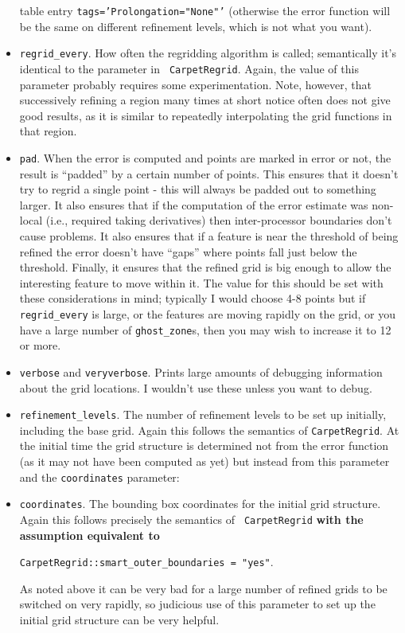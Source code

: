 \begin{itemize}
  table entry {\tt tags='Prolongation="None"'} (otherwise the error
  function will be the same on different refinement levels, which is
  not what you want).
\item {\tt regrid\_every}. How often the regridding algorithm is
  called; semantically it's identical to the parameter in {\tt
    CarpetRegrid}. Again, the value of this parameter probably
  requires some experimentation. Note, however, that successively
  refining a region many times at short notice often does not give
  good results, as it is similar to repeatedly interpolating the grid
  functions in that region.
\item {\tt pad}. When the error is computed and points are marked in
  error or not, the result is ``padded'' by a certain number of
  points. This ensures that it doesn't try to regrid a single point -
  this will always be padded out to something larger. It also ensures
  that if the computation of the error estimate was non-local (i.e.,
  required taking derivatives) then inter-processor boundaries don't
  cause problems. It also ensures that if a feature is near the
  threshold of being refined the error doesn't have ``gaps'' where
  points fall just below the threshold. Finally, it ensures that the
  refined grid is big enough to allow the interesting feature to move
  within it. The value for this should be set with these
  considerations in mind; typically I would choose 4-8 points but if
  {\tt regrid\_every} is large, or the features are moving rapidly on
  the grid, or you have a large number of {\tt ghost\_zone}s, then you
  may wish to increase it to 12 or more.
\item {\tt verbose} and {\tt veryverbose}. Prints large amounts of
  debugging information about the grid locations. I wouldn't use these
  unless you want to debug.
\item {\tt refinement\_levels}. The number of refinement levels to be
  set up initially, including the base grid. Again this follows the
  semantics of {\tt CarpetRegrid}. At the initial time the grid
  structure is determined not from the error function (as it may not
  have been computed as yet) but instead from this parameter and the
  {\tt coordinates} parameter:
\item {\tt coordinates}. The bounding box coordinates for the initial
  grid structure. Again this follows precisely the semantics of {\tt
    CarpetRegrid} {\bf with the assumption equivalent to}

 {\tt CarpetRegrid::smart\_outer\_boundaries = "yes"}.
 
 As noted above it can be very bad for a large number of refined grids
 to be switched on very rapidly, so judicious use of this parameter to
 set up the initial grid structure can be very helpful.
\end{itemize}

